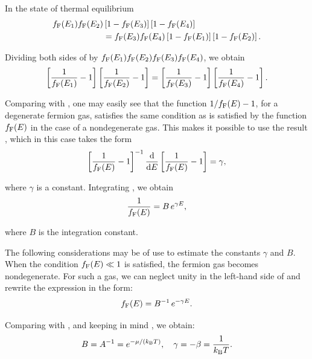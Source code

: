 \noindent
In the state of thermal equilibrium
\begin{align}
    f_{\text{F}}(E_1) f_{\text{F}}(E_2) &\left[1-f_{\text{F}}(E_3)\right] \left[1-f_{\text{F}}(E_4)\right]\nonumber\\
    & = f_{\text{F}}(E_3)f_{\text{F}}(E_4) \left[1-f_{\text{F}}(E_1)\right] \left[1-f_{\text{F}}(E_2)\right].\label{eq:II_3}
\end{align}

\noindent
Dividing both sides of  by $f_{\text{F}}(E_1) f_{\text{F}}(E_2) f_{\text{F}}(E_3)f_{\text{F}}(E_4)$, we
obtain
\begin{equation}\label{eq:II_4}
    \left[\frac{1}{f_{\text{F}}(E_1)} - 1\right] \left[\frac{1}{f_{\text{F}}(E_2)} - 1\right] = \left[\frac{1}{f_{\text{F}}(E_3)} - 1\right] \left[\frac{1}{f_{\text{F}}(E_4)} - 1\right].
\end{equation}

\noindent
Comparing  with , one may easily see that the function $1/f_{\text{F}}(E)-1$, for a degenerate fermion gas, satisfies the same condition as is satisfied by the function $f_{\text{F}}(E)$ in the case of a nondegenerate gas. This makes it possible to use the result , which in this case takes the form
\begin{equation}\label{eq:II_5}
    \left[\frac{1}{f_{\text{F}}(E)} - 1\right]^{-1} \dfrac{\mathrm{d}}{\mathrm{d} E}\left[\frac{1}{f_{\text{F}}(E)} - 1\right] = \gamma,
\end{equation}

\noindent
where $\gamma$ is a constant. Integrating , we obtain
\begin{equation}\label{eq:II_6}
    \frac{1}{f_{\text{F}}(E)} = B\, e^{\gamma E},
\end{equation}

\noindent
where $B$ is the integration constant.

The following considerations may be of use to estimate the constants $\gamma$ and $B$. When the condition $f_{\text{F}}(E)\ll 1$ is satisfied, the fermion gas becomes nondegenerate. For such a gas, we can neglect unity in the left-hand side of  and rewrite the expression in the form:
\begin{equation}\label{eq:II_7}
    f_{\text{F}}(E) = B^{-1}\, e^{-\gamma E}.
\end{equation}

\noindent
Comparing  with , and keeping in mind , we obtain:
\begin{equation}\label{eq:II_8}
    B = A^{-1} = e^{-\mu/(k_{\text{B}}T)},\quad \gamma = -\beta = \frac{1}{k_{\text{B}}T}.
\end{equation}

